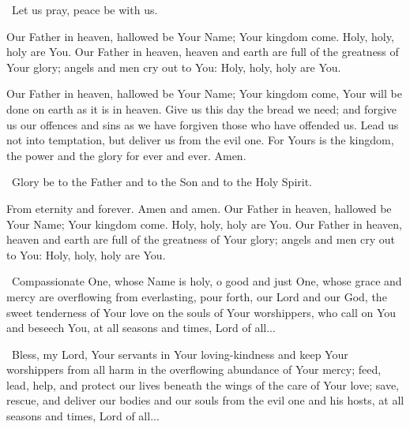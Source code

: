 \documentclass[12pt,twoside,a5paper]{article}
\begin{document}
\begin{halfparskip}
  \rr~Let us pray, peace be with us.


  Our Father in heaven, hallowed be Your Name; Your kingdom come. Holy, holy, holy are You. Our Father in heaven, heaven and earth are full of the greatness of Your glory; angels and men cry out to You: Holy, holy, holy are You.

  Our Father in heaven, hallowed be Your Name; Your kingdom come, Your will be done on earth as it is in heaven. Give us this day the bread we need; and forgive us our offences and sins as we have forgiven those who have offended us. Lead us not into temptation, but deliver us from the evil one. For Yours is the kingdom, the power and the glory for ever and ever. Amen.

  \cc~Glory be to the Father and to the Son and to the Holy Spirit.

  From eternity and forever. Amen and amen. Our Father in heaven, hallowed be Your Name; Your kingdom come. Holy, holy, holy are You. Our Father in heaven, heaven and earth are full of the greatness of Your glory; angels and men cry out to You: Holy, holy, holy are You.

  \cc~Compassionate One, whose Name is holy, o good and just One, whose grace and mercy are overflowing from everlasting, pour forth, our Lord and our God, the sweet tenderness of Your love on the souls of Your worshippers, who call on You and beseech You, at all seasons and times, Lord of all...

  \cc~Bless, my Lord, Your servants in Your loving-kindness and keep Your worshippers from all harm in the overflowing abundance of Your mercy; feed, lead, help, and protect our lives beneath the wings of the care of Your love; save, rescue, and deliver our bodies and our souls from the evil one and his hosts, at all seasons and times, Lord of all...
\end{halfparskip}


\begin{halfparskip}
\end{halfparskip}

\end{document}
